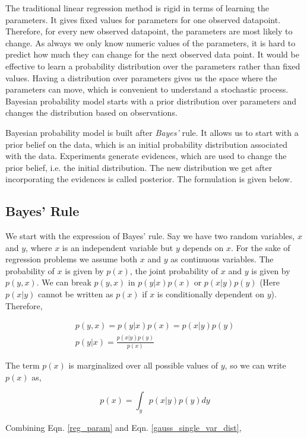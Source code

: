 \documentclass[english]{tktltiki}
\begin{document}
The traditional linear regression method is rigid in terms of learning the parameters. It gives fixed values for parameters for one observed datapoint. Therefore, for every new observed datapoint, the parameters are most likely to change. As always we only know numeric values of the parameters, it is hard to predict how much they can change for the next observed data point.  It would be effective to learn a probability distribution over the parameters rather than fixed values. Having a distribution over parameters gives us the space where the parameters can move, which is convenient to understand a stochastic process. Bayesian probability model starts with a prior distribution over parameters and changes the distribution based on observations.

Bayesian probability model is built after \textit{Bayes'} rule. It allows us to start with a prior belief on the data, which is an initial probability distribution associated with the data. Experiments generate evidences, which are used to change the prior belief, i.e. the initial distribution. The new distribution we get after incorporating the evidences is called posterior. The formulation is given below.

\subsection{Bayes' Rule}

We start with the expression of Bayes' rule. Say we have two random variables, $x$ and $y$, where $x$ is an independent variable but $y$ depends on $x$. For the sake of regression problems we assume both $x$ and $y$ as continuous variables. The probability of $x$ is given by $p(x)$, the joint probability of $x$ and $y$ is given by $p(y, x)$. We can break $p(y, x)$ in $p(y|x)p(x)$ or $p(x|y)p(y)$ (Here $p(x|y)$ cannot be written as $p(x)$ if $x$ is conditionally dependent on $y$). Therefore,

\begin{eqnarray}
p(y, x) = p(y|x)p(x) = p(x|y)p(y)\nonumber\\
p(y|x) = \frac{p(x|y)p(y)}{p(x)}
\end{eqnarray}


The term $p(x)$ is marginalized over all possible values of $y$, so we can write $p(x)$ as,

\begin{equation}
p(x) = \int_y{p(x|y)p(y)dy}
\end{equation}


Combining Eqn. \ref{reg_param} and Eqn. \ref{gauss_single_var_dist},
\end{document}
